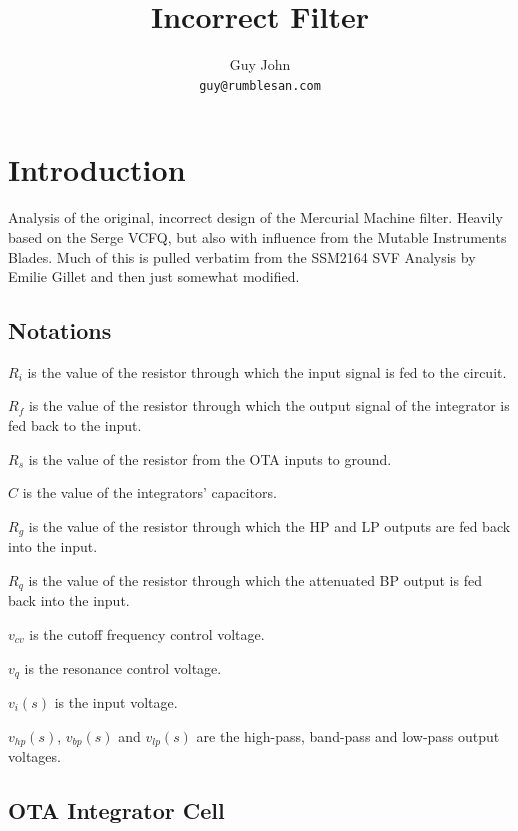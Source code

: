 \documentclass{article}
\title{Incorrect Filter}
\author{Guy John \\ \texttt{guy@rumblesan.com}}
\begin{document}
\maketitle

\section{Introduction}
Analysis of the original, incorrect design of the Mercurial Machine filter. Heavily based on the Serge VCFQ, but also with influence from the Mutable Instruments Blades. Much of this is pulled verbatim from the SSM2164 SVF Analysis by Emilie Gillet and then just somewhat modified.

\newpage

\subsection{Notations}

\begin{description}
\item $R_i$ is the value of the resistor through which the input signal is fed to the circuit.
\item $R_f$ is the value of the resistor through which the output signal of the integrator is fed back to the input.
\item $R_s$ is the value of the resistor from the OTA inputs to ground.
\item $C$ is the value of the integrators' capacitors.
\item $R_g$ is the value of the resistor through which the HP and LP outputs are fed back into the input.
\item $R_q$ is the value of the resistor through which the attenuated BP output is fed back into the input.
\item $v_{cv}$ is the cutoff frequency control voltage.
\item $v_q$ is the resonance control voltage.
\item $v_i(s)$ is the input voltage.
\item $v_{hp}(s)$, $v_{bp}(s)$ and $v_{lp}(s)$ are the high-pass, band-pass and low-pass output voltages.
\end{description}

\subsection{OTA Integrator Cell}
\end{document}
